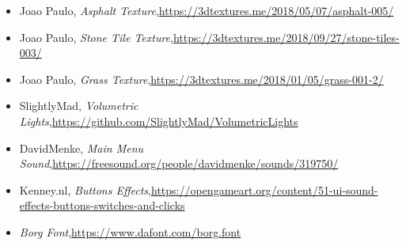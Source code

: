 \begin{itemize}
	\item{Joao Paulo, \textit{Asphalt Texture},\newline \url{https://3dtextures.me/2018/05/07/asphalt-005/}}
	\item{Joao Paulo, \textit{Stone Tile Texture},\newline \url{https://3dtextures.me/2018/09/27/stone-tiles-003/}}
	\item{Joao Paulo, \textit{Grass Texture},\newline \url{https://3dtextures.me/2018/01/05/grass-001-2/}}
	\item{SlightlyMad, \textit{Volumetric Lights},\newline \url{https://github.com/SlightlyMad/VolumetricLights}}
	\item{DavidMenke, \textit{Main Menu Sound},\newline \url{https://freesound.org/people/davidmenke/sounds/319750/}}
	\item{Kenney.nl, \textit{Buttons Effects},\newline \url{https://opengameart.org/content/51-ui-sound-effects-buttons-switches-and-clicks}}
	\item{\textit{Borg Font},\newline \url{https://www.dafont.com/borg.font}}
\end{itemize}
